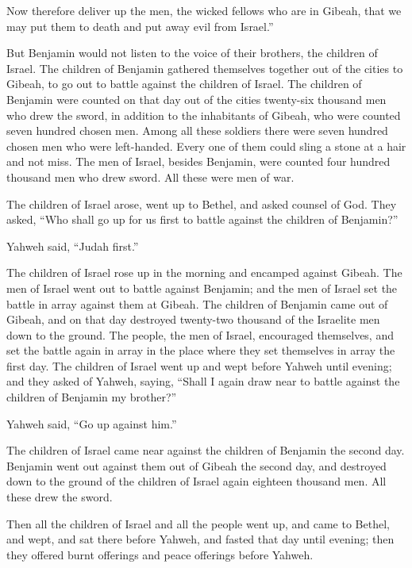 {Now therefore deliver up the men, the wicked fellows who are in Gibeah, that we may put them to death and put away evil from Israel.”
\par }{\PP But Benjamin would not listen to the voice of their brothers, the children of Israel.
The children of Benjamin gathered themselves together out of the cities to Gibeah, to go out to battle against the children of Israel.
The children of Benjamin were counted on that day out of the cities twenty-six thousand men who drew the sword, in addition to the inhabitants of Gibeah, who were counted seven hundred chosen men.
Among all these soldiers there were seven hundred chosen men who were left-handed. Every one of them could sling a stone at a hair and not miss.
The men of Israel, besides Benjamin, were counted four hundred thousand men who drew sword. All these were men of war.
\par }{\PP {}The children of Israel arose, went up to Bethel, and asked counsel of God. They asked, “Who shall go up for us first to battle against the children of Benjamin?”
\par }{\PP Yahweh said, “Judah first.”
\par }{\PP {}The children of Israel rose up in the morning and encamped against Gibeah.
The men of Israel went out to battle against Benjamin; and the men of Israel set the battle in array against them at Gibeah.
The children of Benjamin came out of Gibeah, and on that day destroyed twenty-two thousand of the Israelite men down to the ground.
The people, the men of Israel, encouraged themselves, and set the battle again in array in the place where they set themselves in array the first day.
The children of Israel went up and wept before Yahweh until evening; and they asked of Yahweh, saying, “Shall I again draw near to battle against the children of Benjamin my brother?”
\par }{\PP Yahweh said, “Go up against him.”
\par }{\PP {}The children of Israel came near against the children of Benjamin the second day.
Benjamin went out against them out of Gibeah the second day, and destroyed down to the ground of the children of Israel again eighteen thousand men. All these drew the sword.
\par }{\PP {}Then all the children of Israel and all the people went up, and came to Bethel, and wept, and sat there before Yahweh, and fasted that day until evening; then they offered burnt offerings and peace offerings before Yahweh.
}
